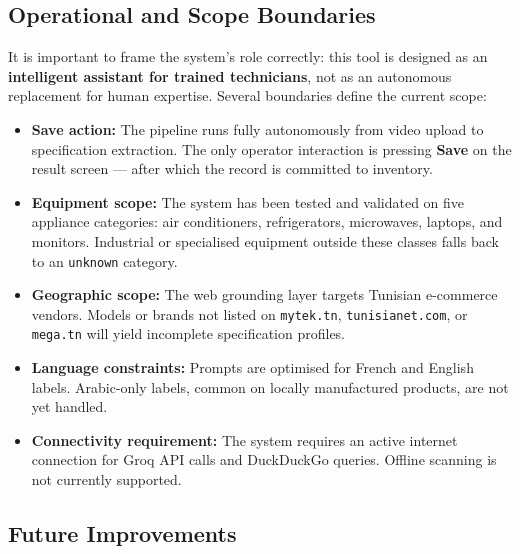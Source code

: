 \subsection{Operational and Scope Boundaries}

It is important to frame the system's role correctly: this tool is designed as an \textbf{intelligent assistant for trained technicians}, not as an autonomous replacement for human expertise. Several boundaries define the current scope:

\begin{itemize}
  \item \textbf{Save action:} The pipeline runs fully autonomously from video upload to specification extraction. The only operator interaction is pressing \textbf{Save} on the result screen — after which the record is committed to inventory.
  \item \textbf{Equipment scope:} The system has been tested and validated on five appliance categories: air conditioners, refrigerators, microwaves, laptops, and monitors. Industrial or specialised equipment outside these classes falls back to an \texttt{unknown} category.
  \item \textbf{Geographic scope:} The web grounding layer targets Tunisian e-commerce vendors. Models or brands not listed on \texttt{mytek.tn}, \texttt{tunisianet.com}, or \texttt{mega.tn} will yield incomplete specification profiles.
  \item \textbf{Language constraints:} Prompts are optimised for French and English labels. Arabic-only labels, common on locally manufactured products, are not yet handled.
  \item \textbf{Connectivity requirement:} The system requires an active internet connection for Groq API calls and DuckDuckGo queries. Offline scanning is not currently supported.
\end{itemize}

\subsection{Future Improvements}

